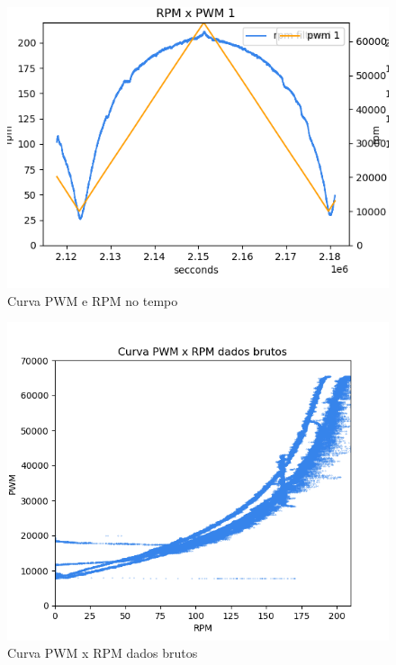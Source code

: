 \begin{figure}[h]
	\centering
	\includegraphics{figures/pwm_x_rpm}
	\caption{Curva PWM e RPM no tempo}
	\label{fig:grafico_pwm_x_rpm}
\end{figure}


\begin{figure}[h]
	\centering
	\includegraphics{figures/curva_pwm_x_rpm_dados_brutos}
	\caption{Curva PWM x RPM dados brutos}
	\label{fig:medicao_pwm_x_rpm_dados_brutos}
\end{figure}


